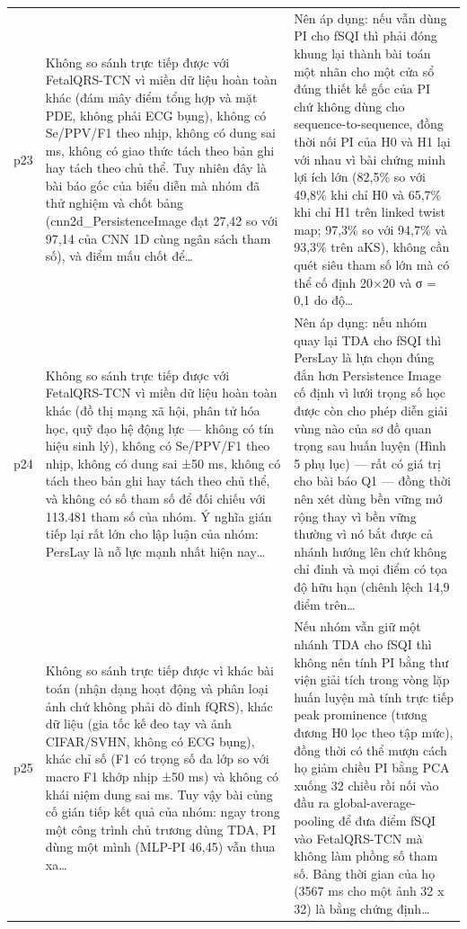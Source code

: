 \begin{longtable}{@{}L{1.05cm} L{6.0cm} L{7.2cm}@{}}
p23 & {\scriptsize Không so sánh trực tiếp được với FetalQRS-TCN vì miền dữ liệu hoàn toàn khác (đám mây điểm tổng hợp và mặt PDE, không phải ECG bụng), không có Se/PPV/F1 theo nhịp, không có dung sai ms, không có giao thức tách theo bản ghi hay tách theo chủ thể. Tuy nhiên đây là bài báo gốc của biểu diễn mà nhóm đã thử nghiệm và chốt bảng (cnn2d\_PersistenceImage đạt 27,42 so với 97,14 của CNN 1D cùng ngân sách tham số), và điểm mấu chốt để…} & {\scriptsize Nên áp dụng: nếu vẫn dùng PI cho fSQI thì phải đóng khung lại thành bài toán một nhãn cho một cửa sổ đúng thiết kế gốc của PI chứ không dùng cho sequence-to-sequence, đồng thời nối PI của H0 và H1 lại với nhau vì bài chứng minh lợi ích lớn (82,5\% so với 49,8\% khi chỉ H0 và 65,7\% khi chỉ H1 trên linked twist map; 97,3\% so với 94,7\% và 93,3\% trên aKS), không cần quét siêu tham số lớn mà có thể cố định 20×20 và σ = 0,1 do độ…} \\[2pt]
p24 & {\scriptsize Không so sánh trực tiếp được với FetalQRS-TCN vì miền dữ liệu hoàn toàn khác (đồ thị mạng xã hội, phân tử hóa học, quỹ đạo hệ động lực — không có tín hiệu sinh lý), không có Se/PPV/F1 theo nhịp, không có dung sai ±50 ms, không có tách theo bản ghi hay tách theo chủ thể, và không có số tham số để đối chiếu với 113.481 tham số của nhóm. Ý nghĩa gián tiếp lại rất lớn cho lập luận của nhóm: PersLay là nỗ lực mạnh nhất hiện nay…} & {\scriptsize Nên áp dụng: nếu nhóm quay lại TDA cho fSQI thì PersLay là lựa chọn đúng đắn hơn Persistence Image cố định vì lưới trọng số học được còn cho phép diễn giải vùng nào của sơ đồ quan trọng sau huấn luyện (Hình 5 phụ lục) — rất có giá trị cho bài báo Q1 — đồng thời nên xét dùng bền vững mở rộng thay vì bền vững thường vì nó bắt được cả nhánh hướng lên chứ không chỉ đỉnh và mọi điểm có tọa độ hữu hạn (chênh lệch 14,9 điểm trên…} \\[2pt]
p25 & {\scriptsize Không so sánh trực tiếp được vì khác bài toán (nhận dạng hoạt động và phân loại ảnh chứ không phải dò đỉnh fQRS), khác dữ liệu (gia tốc kế đeo tay và ảnh CIFAR/SVHN, không có ECG bụng), khác chỉ số (F1 có trọng số đa lớp so với macro F1 khớp nhịp ±50 ms) và không có khái niệm dung sai ms. Tuy vậy bài củng cố gián tiếp kết quả của nhóm: ngay trong một công trình chủ trương dùng TDA, PI dùng một mình (MLP-PI 46,45) vẫn thua xa…} & {\scriptsize Nếu nhóm vẫn giữ một nhánh TDA cho fSQI thì không nên tính PI bằng thư viện giải tích trong vòng lặp huấn luyện mà tính trực tiếp peak prominence (tương đương H0 lọc theo tập mức), đồng thời có thể mượn cách họ giảm chiều PI bằng PCA xuống 32 chiều rồi nối vào đầu ra global-average-pooling để đưa điểm fSQI vào FetalQRS-TCN mà không làm phồng số tham số. Bảng thời gian của họ (3567 ms cho một ảnh 32 x 32) là bằng chứng định…} \\[2pt]

\end{longtable}
